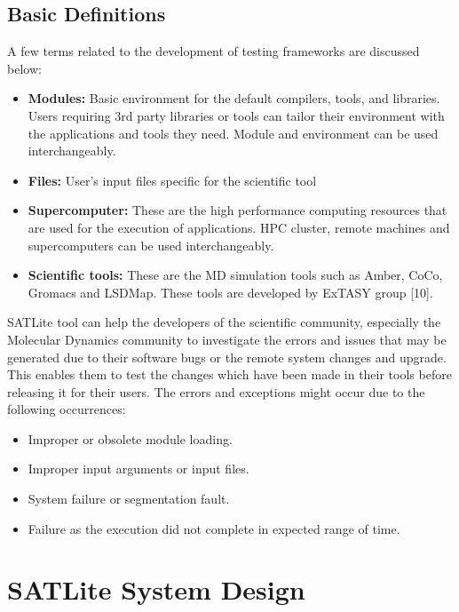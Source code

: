 \documentclass[10pt]{ruthesis}
\begin{document}
\subsection{Basic Definitions}
A few terms related to the development of testing frameworks are discussed below:
\begin{itemize}
\item \textbf{Modules:} Basic environment for the default compilers, tools, and libraries. Users requiring 3rd party libraries or tools can tailor their  environment with the applications and tools they need. Module and environment can be used interchangeably.

\item \textbf{Files:} User's input files specific for the scientific tool

\item \textbf{Supercomputer:} These are the high performance computing resources that are used for the execution of applications. HPC cluster, remote machines and supercomputers can be used interchangeably.

\item \textbf{Scientific tools:} These are the MD simulation tools such as Amber, CoCo, Gromacs and LSDMap. These tools are developed by ExTASY group [10].
\end{itemize}

SATLite tool can help the developers of the scientific community, especially the Molecular Dynamics community to investigate the errors and issues that may be generated due to their software bugs or the remote system changes and upgrade. This enables them to test the changes which have been made in their tools before releasing it for their users. The errors and exceptions might occur due to the following occurrences:

\begin{itemize}
\item Improper or obsolete module loading.
\item Improper input arguments or input files.
\item System failure or segmentation fault.
\item Failure as the execution did not complete in expected range of time.
\end{itemize}

\section{SATLite System Design}
\end{document}
